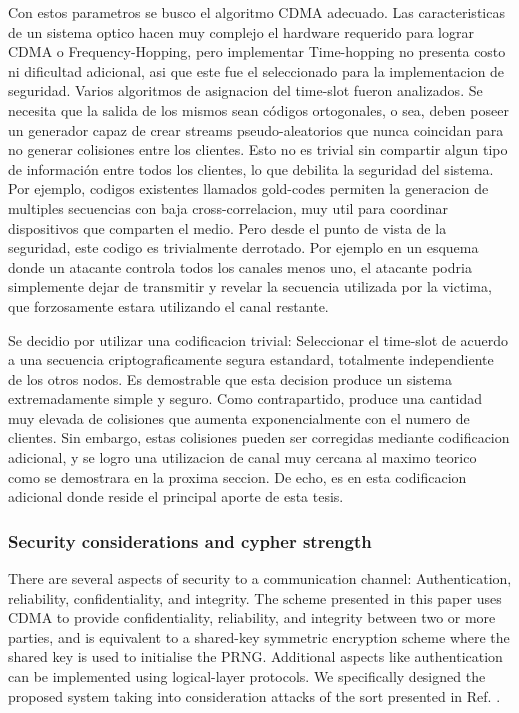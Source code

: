 \documentclass[12pt,twoside,openright]{moddalthesis}
\begin{document}
Con estos parametros se busco el algoritmo CDMA adecuado. Las caracteristicas de un sistema optico hacen muy complejo el hardware requerido para lograr CDMA o Frequency-Hopping, pero implementar Time-hopping no presenta costo ni dificultad adicional, asi que este fue el seleccionado para la implementacion de seguridad.
Varios algoritmos de asignacion del time-slot fueron analizados. Se necesita que la salida de los mismos sean códigos ortogonales, o sea, deben poseer un generador capaz de crear streams pseudo-aleatorios que nunca coincidan para no generar colisiones entre los clientes. Esto no es trivial sin compartir algun tipo de información entre todos los clientes, lo que debilita la seguridad del sistema. Por ejemplo, codigos existentes llamados gold-codes permiten la generacion de multiples secuencias con baja cross-correlacion, muy util para coordinar dispositivos que comparten el medio. Pero desde el punto de vista de la seguridad, este codigo es trivialmente derrotado. Por ejemplo en un esquema donde un atacante controla todos los canales menos uno, el atacante podria simplemente dejar de transmitir y revelar la secuencia utilizada por la victima, que forzosamente estara utilizando el canal restante.

Se decidio por utilizar una codificacion trivial: Seleccionar el time-slot de acuerdo a una secuencia criptograficamente segura estandard, totalmente independiente de los otros nodos. Es demostrable que esta decision produce un sistema extremadamente simple y seguro. Como contrapartido, produce una cantidad muy elevada de colisiones que aumenta exponencialmente con el numero de clientes. Sin embargo, estas colisiones pueden ser corregidas mediante codificacion adicional, y se logro una utilizacion de canal muy cercana al maximo teorico como se demostrara en la proxima seccion. De echo, es en esta codificacion adicional donde reside el principal aporte de esta tesis.

\subsubsection{Security considerations and cypher strength}\label{security}
There are several aspects of security to a communication channel: Authentication, reliability, confidentiality, and integrity.
The scheme presented in this paper uses CDMA to provide confidentiality, reliability, and integrity between two or more parties, and is equivalent to a shared-key symmetric encryption scheme where the shared key is used to initialise the PRNG.
Additional aspects like authentication can be implemented using logical-layer protocols.
We specifically designed the proposed system taking into consideration attacks of the sort presented in Ref. \cite{Shake:05}.
\end{document}
